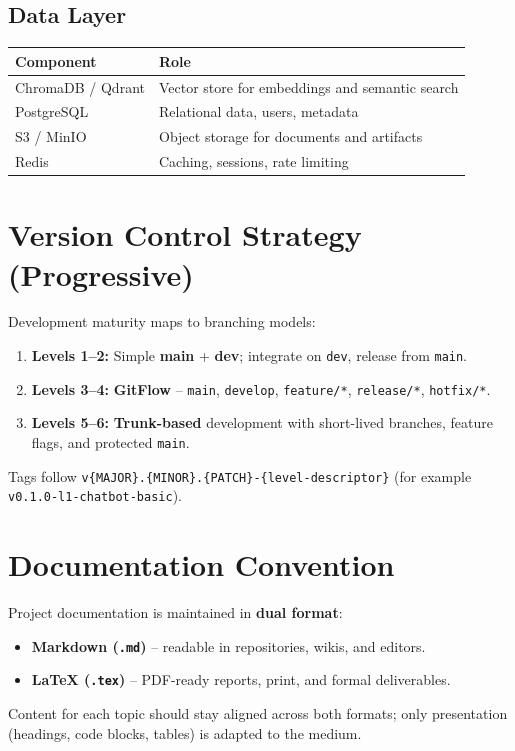 \documentclass{article}
\begin{document}
\subsection{Data Layer}

\begin{tabular}{@{}ll@{}}
\toprule
\textbf{Component} & \textbf{Role} \\
\midrule
ChromaDB / Qdrant & Vector store for embeddings and semantic search \\
PostgreSQL & Relational data, users, metadata \\
S3 / MinIO & Object storage for documents and artifacts \\
Redis & Caching, sessions, rate limiting \\
\bottomrule
\end{tabular}

\section{Version Control Strategy (Progressive)}

Development maturity maps to branching models:

\begin{enumerate}[leftmargin=*]
  \item \textbf{Levels 1--2:} Simple \textbf{main} + \textbf{dev}; integrate on \texttt{dev}, release from \texttt{main}.
  \item \textbf{Levels 3--4:} \textbf{GitFlow} -- \texttt{main}, \texttt{develop}, \texttt{feature/*}, \texttt{release/*}, \texttt{hotfix/*}.
  \item \textbf{Levels 5--6:} \textbf{Trunk-based} development with short-lived branches, feature flags, and protected \texttt{main}.
\end{enumerate}

Tags follow \texttt{v\{MAJOR\}.\{MINOR\}.\{PATCH\}-\{level-descriptor\}} (for example \texttt{v0.1.0-l1-chatbot-basic}).

\section{Documentation Convention}

Project documentation is maintained in \textbf{dual format}:

\begin{itemize}[leftmargin=*]
  \item \textbf{Markdown (\texttt{.md})} -- readable in repositories, wikis, and editors.
  \item \textbf{LaTeX (\texttt{.tex})} -- PDF-ready reports, print, and formal deliverables.
\end{itemize}

Content for each topic should stay aligned across both formats; only presentation (headings, code blocks, tables) is adapted to the medium.
\end{document}
